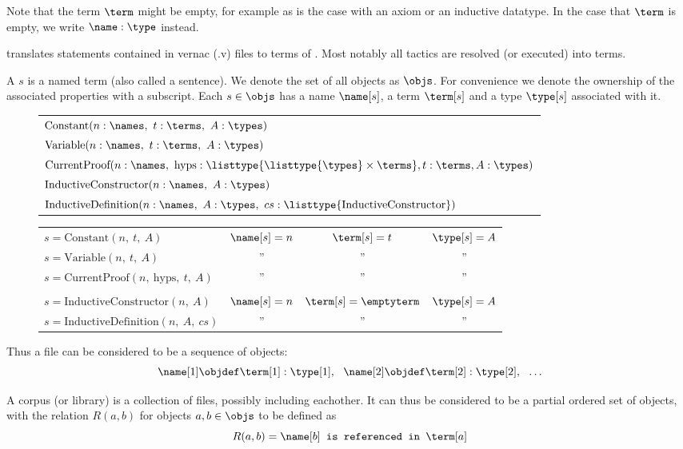 Note that the term $\term$ might be empty, for example as is the case with an axiom or an inductive datatype.
In the case that $\term$ is empty, we write $\name : \type$ instead.

\coq translates \gallina statements contained in \coq vernac (.v) files to terms of \pcic.
Most notably all tactics are resolved (or executed) into terms.

\begin{definition}[{\coqobj[s]}]
	A \coqobj $s$ is a named \pcic term (also called a sentence).
	We denote the set of all \coq objects as $\objs$.
	For convenience we denote the ownership of the associated properties with a subscript.
	Each \coqobj $s \in \objs$ has a name $\name[s]$,
	a term $\term[s]$ and a type $\type[s]$ associated with it.

	\begin{figure}[H]
		\centering
		\begin{tabular}{l}
			$\text{Constant}(n:\names,~ t:\terms,~ A:\types)$ \\
			$\text{Variable}(n:\names,~ t:\terms,~ A:\types)$ \\
			$\text{CurrentProof}(n:\names,~ \text{hyps}:\listtype{\listtype{\types} \times \terms}, t:\terms, A:\types)$ \\
			$\text{InductiveConstructor}(n:\names,~ A:\types)$ \\
			$\text{InductiveDefinition}(n:\names,~ A:\types,~ cs:\listtype{\text{InductiveConstructor}})$
		\end{tabular}
	\end{figure}

	\begin{figure}[H]
		\centering
		\begin{tabular}{lccc}
			$s = \text{Constant}(n,~ t,~ A)$ & $\name[s] = n$ & $\term[s] = t$ & $\type[s] = A$ \\
			$s = \text{Variable}(n,~ t,~ A)$ & '' & '' & '' \\
			$s = \text{CurrentProof}(n,~ \text{hyps},~ t,~ A)$ & '' & '' & '' \\
			 & & & \\
			$s = \text{InductiveConstructor}(n,~ A)$ & $\name[s] = n$ & $\term[s] = \emptyterm$ & $\type[s] = A$ \\
			$s = \text{InductiveDefinition}(n,~ A,~ cs)$ & '' & '' & ''
		\end{tabular}
	\end{figure}
\end{definition}

Thus a \coq file can be considered to be a sequence of \coq objects:
$$ \name[1] \objdef \term[1] : \type[1], ~~ \name[2] \objdef \term[2] : \type[2], ~~ \ldots $$

A \coq corpus (or library) is a collection of \coq files, possibly including eachother.
It can thus be considered to be a partial ordered set of \coq objects, with the relation $R(a,b)$ for \coq objects $a, b \in \objs$ to be defined as
\[R(a,b) = \name[b] \texttt{~is referenced in~} \term[a]\]

